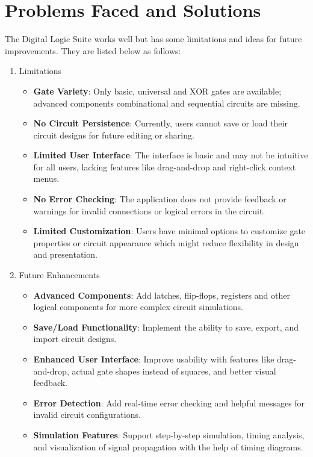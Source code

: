 \section{Problems Faced and Solutions}
The Digital Logic Suite works well but has some limitations and ideas for future improvements. They are listed below as follows:

\begin{enumerate}
    \item Limitations
          \begin{itemize}
              \item \textbf{Gate Variety}: Only basic, universal and XOR gates are available; advanced components combinational and sequential circuits are missing.
              \item \textbf{No Circuit Persistence}: Currently, users cannot save or load their circuit designs for future editing or sharing.
              \item \textbf{Limited User Interface}: The interface is basic and may not be intuitive for all users, lacking features like drag-and-drop and right-click context menus.
              \item \textbf{No Error Checking}: The application does not provide feedback or warnings for invalid connections or logical errors in the circuit.
              \item \textbf{Limited Customization}: Users have minimal options to customize gate properties or circuit appearance which might reduce flexibility in design and presentation.
          \end{itemize}
    \item Future Enhancements
          \begin{itemize}
              \item \textbf{Advanced Components}: Add latches, flip-flops, registers and other logical components for more complex circuit simulations.
              \item \textbf{Save/Load Functionality}: Implement the ability to save, export, and import circuit designs.
              \item \textbf{Enhanced User Interface}: Improve usability with features like drag-and-drop, actual gate shapes instead of squares, and better visual feedback.
              \item \textbf{Error Detection}: Add real-time error checking and helpful messages for invalid circuit configurations.
              \item \textbf{Simulation Features}: Support step-by-step simulation, timing analysis, and visualization of signal propagation with the help of timing diagrams.
          \end{itemize}
\end{enumerate}

\clearpage
